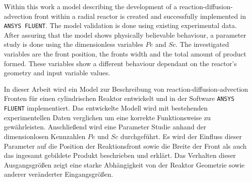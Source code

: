 \documentclass[../thesis.tex]{subfiles}
\begin{document}
\label{chp:abstract}

Within this work a model describing the development of a reaction-diffusion-advection front within a radial reactor is created and successfully implemented in \texttt{ANSYS FLUENT}. The model validation is done using existing experimental data. After assuring that the model shows physically believable behaviour, a parameter study is done using the dimensionless variables $Pe$ and $Sc$. The investigated variables are the front position, the fronts width and the total amount of product formed. These variables show a different behaviour dependant on the reactor's geometry and input variable values.
\newline

In dieser Arbeit wird ein Model zur Beschreibung von reaction-diffusion-advection Fronten für einen cylindrischen Reaktor entwickelt und in der Software \texttt{ANSYS FLUENT} implementiert. Das entwickelte Modell wird mit bestehenden experimentellen Daten verglichen um eine korrekte Funktionsweise zu gewährleisten. Anschließend wird eine Parameter Studie anhand der dimensionlosen Kennzahlen $Pe$ und $Sc$ durchgeführt. Es wird der Einfluss dieser Parameter auf die Position der Reaktionsfront sowie die Breite der Front als auch das ingesamt gebildete Produkt beschrieben und erklärt. Das Verhalten dieser Ausgangsgrößen zeigt eine starke Abhängigkeit von der Reaktor Geometrie sowie anderer veränderter Eingangsgrößen.
\end{document}
